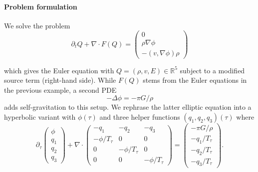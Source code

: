 \paragraph{Problem formulation}
%
We solve the problem
\begin{equation}
 \partial _t Q + \nabla \cdot F(Q) = \left(
  \begin{array}{c}
  0 \\
  \rho \nabla \phi \\
  - (v, \nabla \phi) \rho
  \end{array} 
 \right)
 \label{equation:exahype:case-study:self-gravitation}
\end{equation}

\noindent
which gives the Euler equation with $Q = (\rho, v, E) \in \mathbb{R}^5$ subject to 
a modified source term (right-hand side).
While $F(Q)$ stems from the Euler equations in the previous example, a second PDE
\[
- \Delta \phi = -\pi G/\rho
\]
adds self-gravitation to this setup. We rephrase the latter elliptic equation into
a hyperbolic variant with $\phi (\tau)$ and three helper functions $(q_1,q_2,q_3)(\tau)$ where
\begin{equation}
 \partial _{\tau} 
 \left(
  \begin{array}{c}
   \phi \\ q_1 \\ q_2 \\ q_3
  \end{array} 
 \right)
 + \nabla \cdot
 \left(
  \begin{array}{ccc}
   -q_1 & -q_2 & -q_3 \\
   -\phi/T_\tau & 0 & 0 \\
   0 & -\phi/T_\tau & 0 \\
   0 & 0 & -\phi/T_\tau 
  \end{array} 
 \right)
 = 
  \left(
  \begin{array}{c}
   -\pi G/\rho \\ 
   -q_1/T_\tau \\
   -q_2/T_\tau \\
   -q_3/T_\tau 
  \end{array} 
 \right).
 \label{equation:exahype:case-study:elliptic-hyperbolic-constraint}
\end{equation}

